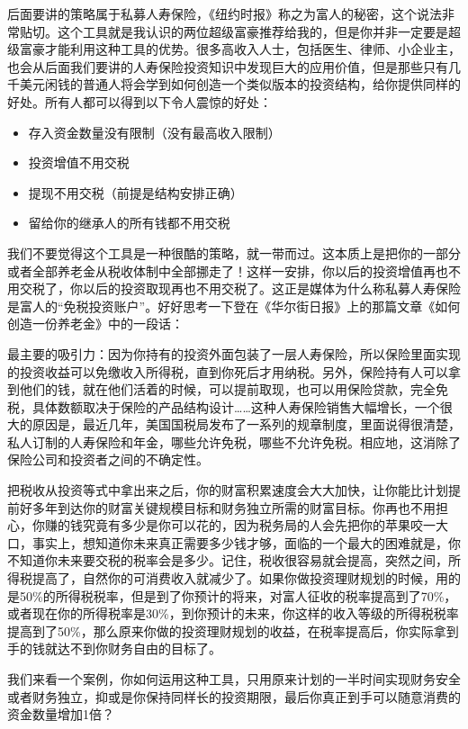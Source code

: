 后面要讲的策略属于私募人寿保险，《纽约时报》称之为富人的秘密，这个说法非常贴切。这个工具就是我认识的两位超级富豪推荐给我的，但是你并非一定要是超级富豪才能利用这种工具的优势。很多高收入人士，包括医生、律师、小企业主，也会从后面我们要讲的人寿保险投资知识中发现巨大的应用价值，但是那些只有几千美元闲钱的普通人将会学到如何创造一个类似版本的投资结构，给你提供同样的好处。所有人都可以得到以下令人震惊的好处：

\begin{itemize}
\item 存入资金数量没有限制（没有最高收入限制）
\item 投资增值不用交税
\item 提现不用交税（前提是结构安排正确）
\item 留给你的继承人的所有钱都不用交税
\end{itemize}

我们不要觉得这个工具是一种很酷的策略，就一带而过。这本质上是把你的一部分或者全部养老金从税收体制中全部挪走了！这样一安排，你以后的投资增值再也不用交税了，你以后的投资取现再也不用交税了。这正是媒体为什么称私募人寿保险是富人的“免税投资账户”。好好思考一下登在《华尔街日报》上的那篇文章《如何创造一份养老金》中的一段话：

最主要的吸引力：因为你持有的投资外面包装了一层人寿保险，所以保险里面实现的投资收益可以免缴收入所得税，直到你死后才用纳税。另外，保险持有人可以拿到他们的钱，就在他们活着的时候，可以提前取现，也可以用保险贷款，完全免税，具体数额取决于保险的产品结构设计……这种人寿保险销售大幅增长，一个很大的原因是，最近几年，美国国税局发布了一系列的规章制度，里面说得很清楚，私人订制的人寿保险和年金，哪些允许免税，哪些不允许免税。相应地，这消除了保险公司和投资者之间的不确定性。

把税收从投资等式中拿出来之后，你的财富积累速度会大大加快，让你能比计划提前好多年到达你的财富关键规模目标和财务独立所需的财富目标。你再也不用担心，你赚的钱究竟有多少是你可以花的，因为税务局的人会先把你的苹果咬一大口，事实上，想知道你未来真正需要多少钱才够，面临的一个最大的困难就是，你不知道你未来要交税的税率会是多少。记住，税收很容易就会提高，突然之间，所得税提高了，自然你的可消费收入就减少了。如果你做投资理财规划的时候，用的是50\%的所得税税率，但是到了你预计的将来，对富人征收的税率提高到了70\%，或者现在你的所得税率是30\%，到你预计的未来，你这样的收入等级的所得税税率提高到了50\%，那么原来你做的投资理财规划的收益，在税率提高后，你实际拿到手的钱就达不到你财务自由的目标了。

我们来看一个案例，你如何运用这种工具，只用原来计划的一半时间实现财务安全或者财务独立，抑或是你保持同样长的投资期限，最后你真正到手可以随意消费的资金数量增加1倍？

